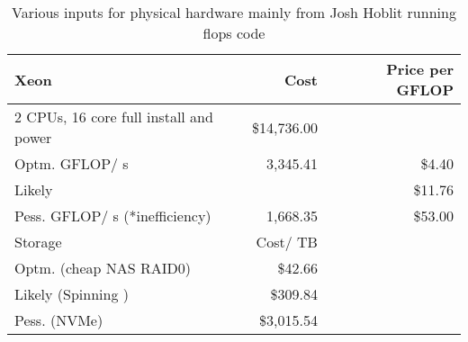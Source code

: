 \tiny \begin{longtable} { |p{}  |r  |r |} 
\caption{Various inputs for physical hardware mainly from Josh Hoblit running flops code \label{tab:PhysicalInputs}}\\ 
\hline 
{Xeon}&{Cost}&{Price per GFLOP} \\ \hline
{2 CPUs, 16 core full install and power}&{\$14,736.00}& \\ \hline
{Optm. GFLOP/ s}&{3,345.41}&{\$4.40} \\ \hline
{Likely }&{}&{\$11.76} \\ \hline
{Pess. GFLOP/ s  (*inefficiency)}&{1,668.35}&{\$53.00} \\ \hline
{Storage }&{Cost/ TB}& \\ \hline
{Optm. (cheap NAS RAID0)}&{\$42.66}& \\ \hline
{Likely (Spinning )}&{\$309.84}& \\ \hline
{Pess. (NVMe)}&{\$3,015.54}& \\ \hline
\end{longtable} \normalsize

